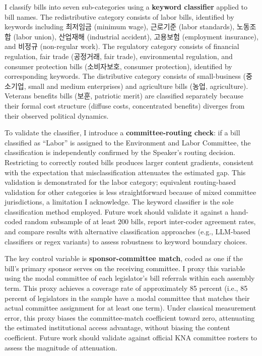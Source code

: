 \documentclass[11pt]{article}
\begin{document}
I classify bills into seven sub-categories using a \textbf{keyword classifier} applied to bill names. The redistributive category consists of labor bills, identified by keywords including 최저임금 (minimum wage), 근로기준 (labor standards), 노동조합 (labor union), 산업재해 (industrial accident), 고용보험 (employment insurance), and 비정규 (non-regular work). The regulatory category consists of financial regulation, fair trade (공정거래, fair trade), environmental regulation, and consumer protection bills (소비자보호, consumer protection), identified by corresponding keywords. The distributive category consists of small-business (중소기업, small and medium enterprises) and agriculture bills (농업, agriculture). Veterans benefits bills (보훈, patriotic merit) are classified separately because their formal cost structure (diffuse costs, concentrated benefits) diverges from their observed political dynamics.

To validate the classifier, I introduce a \textbf{committee-routing check}: if a bill classified as ``Labor'' is assigned to the Environment and Labor Committee, the classification is independently confirmed by the Speaker's routing decision. Restricting to correctly routed bills produces larger content gradients, consistent with the expectation that misclassification attenuates the estimated gap. This validation is demonstrated for the labor category; equivalent routing-based validation for other categories is less straightforward because of mixed committee jurisdictions, a limitation I acknowledge. The keyword classifier is the sole classification method employed. Future work should validate it against a hand-coded random subsample of at least 200 bills, report inter-coder agreement rates, and compare results with alternative classification approaches (e.g., LLM-based classifiers or regex variants) to assess robustness to keyword boundary choices.

The key control variable is \textbf{sponsor-committee match}, coded as one if the bill's primary sponsor serves on the receiving committee. I proxy this variable using the modal committee of each legislator's bill referrals within each assembly term. This proxy achieves a coverage rate of approximately 85 percent (i.e., 85 percent of legislators in the sample have a modal committee that matches their actual committee assignment for at least one term). Under classical measurement error, this proxy biases the committee-match coefficient toward zero, attenuating the estimated institutional access advantage, without biasing the content coefficient. Future work should validate against official KNA committee rosters to assess the magnitude of attenuation.
\end{document}
